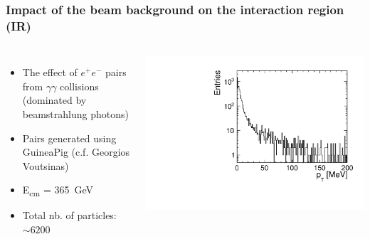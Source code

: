 \documentclass[aspectratio=169, hyperref={colorlinks=true,pdfpagelabels=false,linkcolor=black}, xcolor=dvipsnames,10pt]{beamer}
\begin{document}
\begin{frame}
	\frametitle{Impact of the beam background on the interaction region (IR)}

	\begin{columns}
	\begin{itemize}
	\item The effect of $e^{+}e^{-}$ pairs from $\gamma\gamma$ collisions (dominated by beamstrahlung photons)
	\item Pairs generated using GuineaPig (c.f. Georgios Voutsinas)
	\item E\textsubscript{cm} = 365~GeV
	\item Total nb. of particles: $\sim6200$
	\end{itemize}		
        \vspace{0.2cm}
		\centering
		\includegraphics[width=\textwidth]{../figures/incoherentPairs_pT.pdf} 
	\end{columns}	
	

\end{frame}
\end{document}
